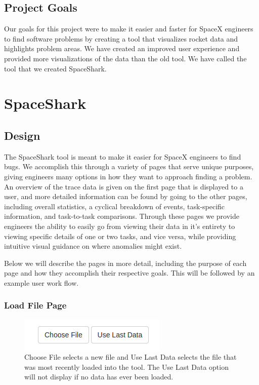 \documentclass{hmcclinic}
\begin{document}
\section{Project Goals} %
Our goals for this project were to make it easier and faster for SpaceX engineers to find software problems by creating a tool that visualizes rocket data and highlights problem areas. We have created an improved user experience and provided more visualizations of the data than the old tool. We have called the tool that we created SpaceShark.

\chapter{SpaceShark}
\section{Design} %

  The SpaceShark tool is meant to make it easier for SpaceX engineers to find bugs. We
  accomplish this through a variety of pages that serve unique purposes, giving
  engineers many options in how they want to approach finding a problem. 
  An overview of the trace data is given on the first page that is displayed to a user, 
  and more detailed information can be found by going to the other
  pages, including overall statistics, a cyclical breakdown of events, task-specific information, and
  task-to-task comparisons. Through these pages we provide engineers the ability
  to easily go from viewing their data in it's entirety to viewing specific
  details of one or two tasks, and vice versa, while providing intuitive visual
  guidance on where anomalies might exist.
  
  Below we will describe the pages in more detail, including the purpose
  of each page and how they accomplish their respective goals. This will be
  followed by an example user work flow.

\subsection{Load File Page}

\begin{figure}[H]
  \centering
      \includegraphics[scale=0.75]{loadFile-buttons.png}
  \caption{Choose File selects a new file and Use Last Data selects the file
  that was most recently loaded into the tool. The Use Last Data option will not
display if no data has ever been loaded.}
  \end{figure}
\end{document}
